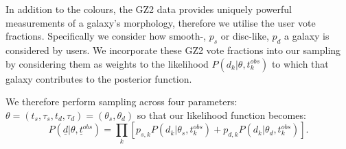 \documentclass{mn2e}
\begin{document}
In addition to the colours, the GZ2 data provides uniquely powerful measurements of a galaxy's morphology, therefore we utilise the user vote fractions. Specifically we consider how smooth-, $p_s$ or disc-like, $p_d$ a galaxy is considered by users.
We incorporate these GZ2 vote fractions  into our sampling by considering them as weights to the likelihood $P(d_{k}|\theta, t^{obs}_{k})$ to which that galaxy contributes to the posterior function. 


%

We therefore perform sampling across four parameters: $\theta = (t_{s}, \tau_{s}, t_{d}, \tau_{d}) = (\theta_{s}, \theta_{d})$ so that our likelihood function becomes:
\begin{equation}
P(\underline{d}|\theta, \underline{t}^{obs}) = \prod_{k} \left [p_{s, k} P(d_{k}|\theta_{s}, t_{k}^{obs}) + p_{d, k} P(d_{k}|\theta_{d}, t_{k}^{obs}) \right].
\end{equation}

\end{document}
